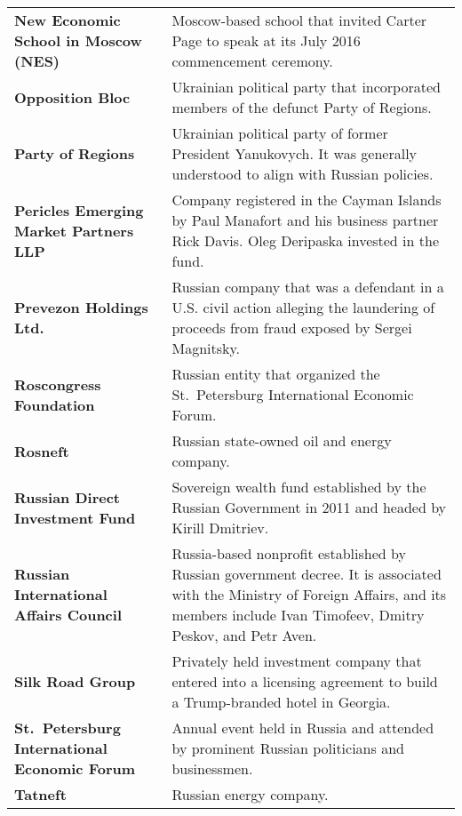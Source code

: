 \begin{longtable}{ p{} p{} }
    \textbf{New Economic School in Moscow (NES)} & Moscow-based school that invited Carter Page to speak at its July 2016 commencement ceremony. \\

    \textbf{Opposition Bloc} & Ukrainian political party that incorporated members of the defunct Party of Regions. \\

    \textbf{Party of Regions} & Ukrainian political party of former President Yanukovych. It was generally understood to align with Russian policies. \\

    \textbf{Pericles Emerging Market Partners LLP} & Company registered in the Cayman Islands by Paul Manafort and his business partner Rick Davis. Oleg Deripaska invested in the fund. \\

    \textbf{Prevezon Holdings Ltd.} & Russian company that was a defendant in a U.S. civil action alleging the laundering of proceeds from fraud exposed by Sergei Magnitsky. \\

    \textbf{Roscongress Foundation} & Russian entity that organized the St.~Petersburg International Economic Forum. \\

    \textbf{Rosneft} & Russian state-owned oil and energy company. \\

    \textbf{Russian Direct Investment Fund} & Sovereign wealth fund established by the Russian Government in 2011 and headed by Kirill Dmitriev. \\

    \textbf{Russian International Affairs Council} & Russia-based nonprofit established by Russian government decree. It is associated with the Ministry of Foreign Affairs, and its members include Ivan Timofeev, Dmitry Peskov, and Petr Aven. \\

    \textbf{Silk Road Group} & Privately held investment company that entered into a licensing agreement to build a Trump-branded hotel in Georgia. \\

    \textbf{St.~Petersburg International Economic Forum} & Annual event held in Russia and attended by prominent Russian politicians and businessmen. \\

    \textbf{Tatneft} & Russian energy company. \\


\end{longtable}
